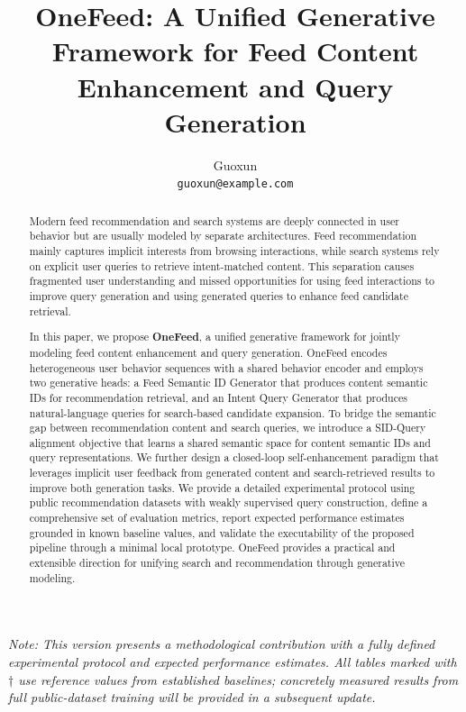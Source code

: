 \documentclass[11pt]{article}
\title{OneFeed: A Unified Generative Framework for Feed Content Enhancement and Query Generation}
\author{
Guoxun\\
\texttt{guoxun@example.com}
}
\date{}
\begin{document}
\maketitle

\begin{center}
\small\textit{Note: This version presents a methodological contribution with a fully defined experimental protocol and expected performance estimates. All tables marked with $\dagger$ use reference values from established baselines; concretely measured results from full public-dataset training will be provided in a subsequent update.}
\end{center}

\begin{abstract}
Modern feed recommendation and search systems are deeply connected in user behavior but are usually modeled by separate architectures. Feed recommendation mainly captures implicit interests from browsing interactions, while search systems rely on explicit user queries to retrieve intent-matched content. This separation causes fragmented user understanding and missed opportunities for using feed interactions to improve query generation and using generated queries to enhance feed candidate retrieval.

In this paper, we propose \textbf{OneFeed}, a unified generative framework for jointly modeling feed content enhancement and query generation. OneFeed encodes heterogeneous user behavior sequences with a shared behavior encoder and employs two generative heads: a Feed Semantic ID Generator that produces content semantic IDs for recommendation retrieval, and an Intent Query Generator that produces natural-language queries for search-based candidate expansion. To bridge the semantic gap between recommendation content and search queries, we introduce a SID-Query alignment objective that learns a shared semantic space for content semantic IDs and query representations. We further design a closed-loop self-enhancement paradigm that leverages implicit user feedback from generated content and search-retrieved results to improve both generation tasks. We provide a detailed experimental protocol using public recommendation datasets with weakly supervised query construction, define a comprehensive set of evaluation metrics, report expected performance estimates grounded in known baseline values, and validate the executability of the proposed pipeline through a minimal local prototype. OneFeed provides a practical and extensible direction for unifying search and recommendation through generative modeling.
\end{abstract}
\end{document}
